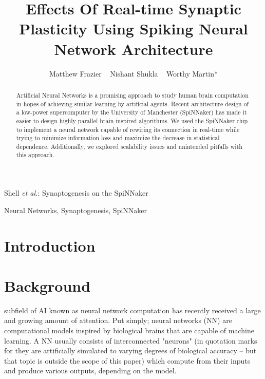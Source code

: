 \documentclass[journal]{./sty/IEEEtran}
\begin{document}
%
\title{Effects Of Real-time Synaptic Plasticity Using Spiking Neural Network Architecture
}


\author{Matthew Frazier ~
        Nishant Shukla ~
        Worthy Martin* }

%
{Shell \MakeLowercase{\textit{et al.}}: Synaptogenesis on the SpiNNaker}


\maketitle

\begin{abstract}
Artificial Neural Networks is a promising approach to study human brain computation in hopes of achieving similar learning by artificial agents.
Recent architecture design of a low-power supercomputer by the University of Manchester (SpiNNaker) has made it easier to design highly parallel brain-inspired algorithms.
We used the SpiNNaker chip to implement a neural network capable of rewiring its connection in real-time while trying to minimize information loss and maximize the decrease in statistical dependence.
Additionally, we explored scalability issues and unintended pitfalls with this approach.

\end{abstract}

\begin{IEEEkeywords}
Neural Networks, Synaptogenesis, SpiNNaker
\end{IEEEkeywords}

\section{Introduction}


\section{Background}
 subfield of AI known as neural network computation has recently received a large and growing amount of attention. 
Put simply; neural networks (NN) are computational models inspired by biological brains that are capable of machine learning. 
A NN usually consists of interconnected "neurons" (in quotation marks for they are artificially simulated to varying degrees of biological accuracy -- but that topic is outside the scope of this paper) which compute from their inputs and produce various outputs, depending on the model. 
\end{document}
